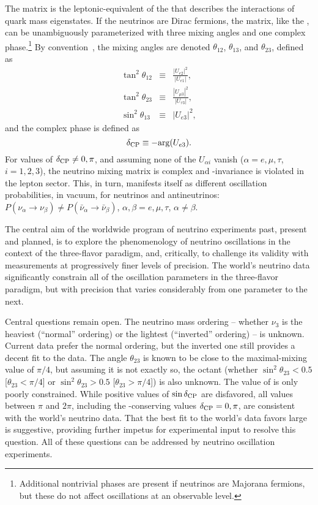 The  matrix is the leptonic-equivalent of the  %
that describes the  interactions of quark mass 
eigenstates. If the neutrinos are Dirac fermions, the  matrix, 
like the , can be unambiguously parameterized with three mixing 
angles and one complex phase.\footnote{Additional nontrivial phases are present 
if neutrinos are Majorana fermions, but these do not affect oscillations at 
an observable level.} By convention~\cite{Tanabashi:2018oca}, the mixing angles 
are denoted $\theta_{12}$, $\theta_{13}$, and $\theta_{23}$, defined as
\begin{eqnarray}
\tan^2\theta_{12} &\equiv& \frac{|U_{e2}|^2}{|U_{e1}|}, \\
\tan^2\theta_{23} &\equiv& \frac{|U_{\mu3}|^2}{|U_{\tau3}|}, \\
\sin^2\theta_{13} &\equiv& |U_{e3}|^2,
\end{eqnarray} 
and the complex phase \deltacp is defined as
\begin{equation}
\delta_{\rm CP} \equiv -{\rm arg}(U_{e3}).
\end{equation}
For values of $\delta_{\rm CP}\neq 0,\pi$, and assuming none of the $U_{\alpha i}$ 
vanish ($\alpha=e,\mu,\tau$, $i=1,2,3$), the neutrino mixing matrix is complex 
and -invariance is violated in the lepton sector. This, in turn, manifests 
itself as different oscillation probabilities, in vacuum, for neutrinos 
and antineutrinos: $P(\nu_{\alpha}\to\nu_{\beta})\neq 
P(\bar{\nu}_{\alpha}\to\bar{\nu}_{\beta})$, $\alpha,\beta=e,\mu,\tau$, $\alpha\neq\beta$.

The central aim of the worldwide program of %
neutrino experiments past, present and planned, is to explore 
the phenomenology of neutrino oscillations in the context of the 
three-flavor paradigm, and, critically, 
to challenge its validity with measurements at progressively 
finer levels of precision.  The world's neutrino data significantly constrain 
all of the oscillation parameters in the three-flavor paradigm, but 
with precision that varies considerably from one parameter to the next.

Central questions remain open. The neutrino mass ordering -- whether $\nu_3$ is 
the heaviest (``normal'' ordering) or the lightest (``inverted'' ordering) -- is unknown. 
Current data prefer the normal ordering, but the inverted one still 
provides a decent fit to the data. The angle $\theta_{23}$ is known to be 
close to the maximal-mixing value of $\pi/4$, but assuming it is not exactly 
so, the octant 
(whether $\sin^2\theta_{23}<0.5$ [$\theta_{23}<\pi/4$] or 
$\sin^2\theta_{23}>0.5$ [$\theta_{23}>\pi/4$]) is also unknown. 
The value of \deltacp is only poorly constrained. While positive 
values of $\sin\delta_{\rm CP}$ are disfavored, all values between $\pi$ and $2\pi$, 
including the -conserving values $\delta_{\rm CP}=0,\pi$, are consistent with 
the world's neutrino data.  That the best fit to the world's data 
favors large  is suggestive, providing further impetus 
for experimental input to resolve this question.
All of these questions can be addressed 
by neutrino oscillation experiments.

